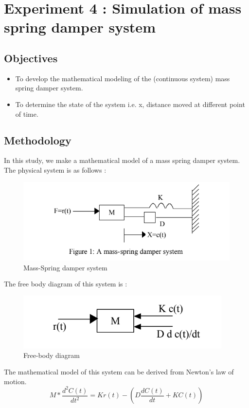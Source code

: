 \documentclass[10pt,journal,cspaper,compsoc]{IEEEtran}
\begin{document}
\section{Experiment 4 : Simulation of mass spring damper system}
\subsection{Objectives}
\begin{itemize}
  \item To develop the mathematical modeling of the (continuous system) mass spring damper system.
  \item To determine the state of the system i.e. x, distance moved at different point of time.
\end{itemize}  
\subsection{Methodology}
In this study, we make a mathematical model of a mass spring damper system. The physical system is as follows :
\begin{figure}[h!]
  \centering
  \includegraphics[scale= 0.7]{images/spring-mass.PNG}
  \caption{Mass-Spring damper system}
\end{figure}
The free body diagram of this system is :
\begin{figure}[h!]
  \centering
  \includegraphics{images/sping_mass_freebody.PNG}
  \caption{Free-body diagram}
\end{figure}
 The mathematical model of this system can be derived from Newton's law of motion.
 \begin{equation*}
  M * \frac{d^2C(t)}{dt^2} = K r(t) - (D \frac{dC(t)}{dt} + K C(t))
 \end{equation*}
\end{document}
